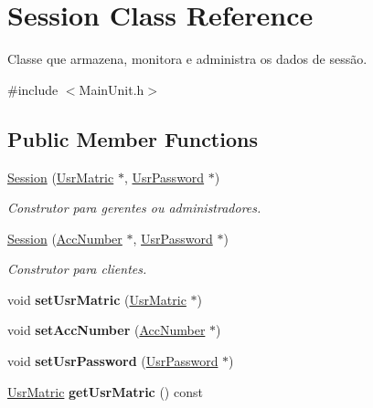 \hypertarget{classSession}{\section{Session Class Reference}
\label{de/d41/classSession}
}


Classe que armazena, monitora e administra os dados de sessão.  




{\ttfamily \#include $<$Main\-Unit.\-h$>$}

\subsection*{Public Member Functions}
\begin{DoxyCompactItemize}
\item 
\hyperlink{classSession_a216a4f17b0c16bd7e2e5ace3c5500efa}{Session} (\hyperlink{classUsrMatric}{Usr\-Matric} $\ast$, \hyperlink{classUsrPassword}{Usr\-Password} $\ast$)
\begin{DoxyCompactList}\small\item\em Construtor para gerentes ou administradores. \end{DoxyCompactList}\item 
\hyperlink{classSession_ad94e7557f00ffe2abd64acf12d6f79d4}{Session} (\hyperlink{classAccNumber}{Acc\-Number} $\ast$, \hyperlink{classUsrPassword}{Usr\-Password} $\ast$)
\begin{DoxyCompactList}\small\item\em Construtor para clientes. \end{DoxyCompactList}\item 
\hypertarget{classSession_a8aff9f54e6d36a716794e7477820dc72}{void {\bfseries set\-Usr\-Matric} (\hyperlink{classUsrMatric}{Usr\-Matric} $\ast$)}\label{de/d41/classSession_a8aff9f54e6d36a716794e7477820dc72}

\item 
\hypertarget{classSession_a350981c1ca9d9eb3e3b78495a84a3acd}{void {\bfseries set\-Acc\-Number} (\hyperlink{classAccNumber}{Acc\-Number} $\ast$)}\label{de/d41/classSession_a350981c1ca9d9eb3e3b78495a84a3acd}

\item 
\hypertarget{classSession_a0c2ea92fd94940c314e6d5728bbe3725}{void {\bfseries set\-Usr\-Password} (\hyperlink{classUsrPassword}{Usr\-Password} $\ast$)}\label{de/d41/classSession_a0c2ea92fd94940c314e6d5728bbe3725}

\item 
\hypertarget{classSession_ab652b031c32df3f5c3c6ff4011477be9}{\hyperlink{classUsrMatric}{Usr\-Matric} {\bfseries get\-Usr\-Matric} () const }\label{de/d41/classSession_ab652b031c32df3f5c3c6ff4011477be9}


\end{DoxyCompactItemize}
